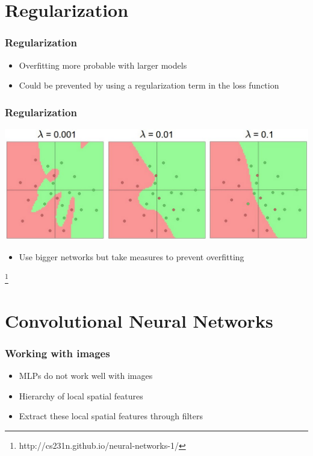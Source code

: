 \documentclass{beamer}
\newcommand\blfootnote[1]{%
  \begingroup
  \renewcommand\thefootnote{}\footnote{#1}%
  \addtocounter{footnote}{-1}%
  \endgroup
}
\begin{document}
\section{Regularization}

\begin{frame}
  \frametitle{Regularization}
  \begin{itemize}
  \item Overfitting more probable with larger models
  \item Could be prevented by using a regularization term in the loss function
  \end{itemize}
\end{frame}

\begin{frame}
  \frametitle{Regularization}
  \includegraphics[width=\textwidth]{reg_strengths.jpeg}
  \begin{itemize}
  \item Use bigger networks but take measures to prevent overfitting
  \end{itemize}
  \blfootnote{http://cs231n.github.io/neural-networks-1/}
\end{frame}

\section{Convolutional Neural Networks}

\begin{frame}
  \frametitle{Working with images}
  \begin{itemize}
  \item MLPs do not work well with images
  \item Hierarchy of local spatial features
  \item Extract these local spatial features through filters
  \end{itemize}
\end{frame}
\end{document}
